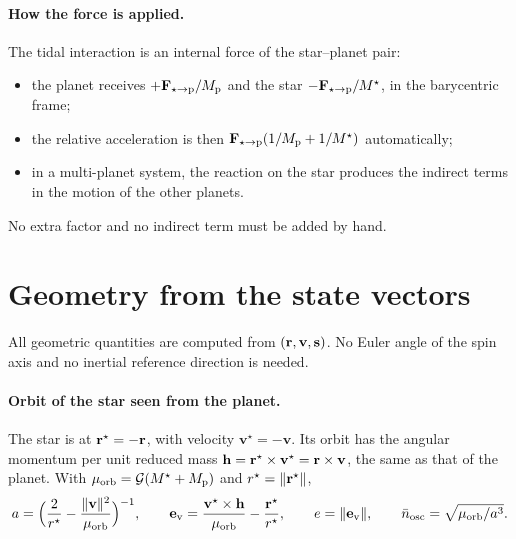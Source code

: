 \paragraph{How the force is applied.} The tidal interaction is an internal force of the star--planet pair:
\begin{itemize}
  \item the planet receives $+\mathbf F_{\star\to\mathrm p}/M_{\mathrm p}$ and the star $-\mathbf F_{\star\to\mathrm p}/M^\star$, in the barycentric frame;
  \item the relative acceleration is then $\mathbf F_{\star\to\mathrm p}(1/M_{\mathrm p}+1/M^\star)$ automatically;
  \item in a multi-planet system, the reaction on the star produces the indirect terms in the motion of the other planets.
\end{itemize}
No extra factor and no indirect term must be added by hand.

\section{Geometry from the state vectors}\label{sec:geometry}
All geometric quantities are computed from $(\mathbf r,\mathbf v,\mathbf s)$. No Euler angle of the spin axis and no inertial reference direction is needed.

\paragraph{Orbit of the star seen from the planet.} The star is at $\mathbf r^\star=-\mathbf r$, with velocity $\mathbf v^\star=-\mathbf v$. Its orbit has the angular momentum per unit reduced mass $\mathbf h=\mathbf r^\star\times\mathbf v^\star=\mathbf r\times\mathbf v$, the same as that of the planet. With $\mu_{\rm orb}=\mathcal{G}(M^\star+M_{\mathrm p})$ and $r^\star=\|\mathbf r^\star\|$,
\begin{equation}
  a=\Big(\frac{2}{r^\star}-\frac{\|\mathbf v\|^2}{\mu_{\rm orb}}\Big)^{-1},\qquad
  \mathbf e_{\rm v}=\frac{\mathbf v^\star\times\mathbf h}{\mu_{\rm orb}}-\frac{\mathbf r^\star}{r^\star},\qquad
  e=\|\mathbf e_{\rm v}\|,\qquad \bar n_{\rm osc}=\sqrt{\mu_{\rm orb}/a^3}. \label{eq:elements-a-e}
\end{equation}

